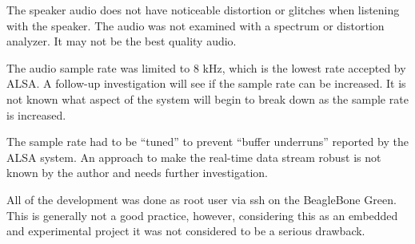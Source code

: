 The speaker audio does not have noticeable distortion or glitches when listening with the speaker.  The audio was not examined with a spectrum or distortion analyzer.  It may not be the best quality audio.

The audio sample rate was limited to 8 kHz, which is the lowest rate accepted by ALSA.  A follow-up investigation will see if the sample rate can be increased.  It is not known what aspect of the system will begin to break down as the sample rate is increased.

The sample rate had to be ``tuned'' to prevent ``buffer underruns'' reported by the ALSA system.  An approach to make the real-time data stream robust is not known by the author and needs further investigation.

All of the development was done as root user via ssh on the BeagleBone Green.  This is generally not a good practice, however, considering this as an embedded and experimental project it was not considered to be a serious drawback.


